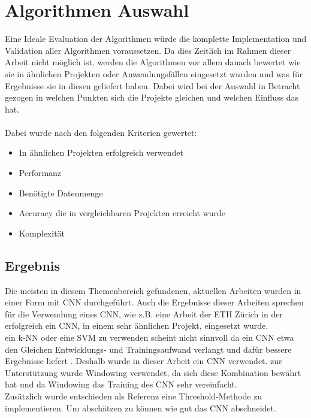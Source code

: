 \section{Algorithmen Auswahl}

Eine Ideale Evaluation der Algorithmen würde die komplette Implementation und Validation aller Algorithmen voraussetzen. Da dies Zeitlich im Rahmen dieser Arbeit nicht möglich ist, werden die Algorithmen vor allem danach bewertet wie sie in ähnlichen Projekten oder Anwendungsfällen eingesetzt wurden und was für Ergebnisse sie in diesen geliefert haben. Dabei wird bei der Auswahl in Betracht gezogen in welchen Punkten sich die Projekte gleichen und welchen Einfluss das hat.\\
\\
Dabei wurde nach den folgenden Kriterien gewertet:
\begin{itemize}
	\item In ähnlichen Projekten erfolgreich verwendet
	\item Performanz
	\item Benötigte Datenmenge
	\item Accuracy die in vergleichbaren Projekten erreicht wurde
	\item Komplexität
\end{itemize}

\subsection{Ergebnis}

Die meisten in diesem Themenbereich gefundenen, aktuellen Arbeiten wurden in einer Form mit \gls{CNN} durchgeführt. Auch die Ergebnisse dieser Arbeiten sprechen für die Verwendung eines \gls{CNN}, wie z.B. eine Arbeit der ETH Zürich \parencite{gomez2018thermal} in der erfolgreich ein \gls{CNN}, in einem sehr ähnlichen Projekt, eingesetzt wurde. \\
ein \gls{k-NN} oder eine \gls{SVM} zu verwenden scheint nicht sinnvoll da ein \gls{CNN} etwa den Gleichen Entwicklungs- und Trainingsaufwand verlangt und dafür bessere Ergebnisse liefert \parencite{comparison_algorithms}.
Deshalb wurde in dieser Arbeit ein \gls{CNN} verwendet. zur Unterstützung wurde Windowing verwendet, da sich diese Kombination bewährt hat \parencite{gomez2018thermal} und da Windowing das Training des CNN sehr vereinfacht.\\
Zusätzlich wurde entschieden als Referenz eine Threshold-Methode zu implementieren. Um abschätzen zu können wie gut das \gls{CNN} abschneidet.





